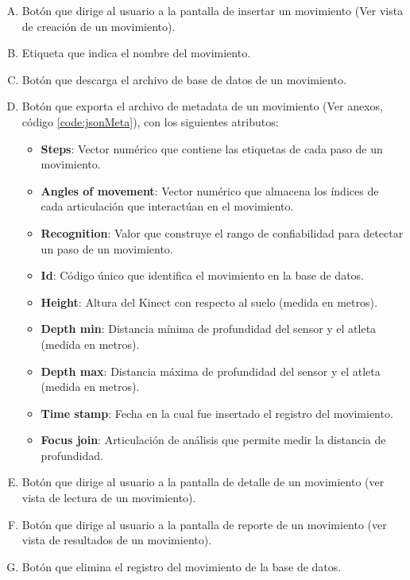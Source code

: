 \begin{enumerate}[A.]
\item Bot\'on que dirige al usuario a la pantalla de insertar un movimiento (Ver vista de creaci\'on de un movimiento).
\item Etiqueta que indica el nombre del movimiento.
\item Bot\'on que descarga el archivo de base de datos de un movimiento.
\item Bot\'on que exporta el archivo de metadata de un movimiento (Ver anexos, c\'odigo \ref{code:jsonMeta}), con los siguientes atributos:
	\begin{itemize}
	\item \textbf{Steps}: Vector num\'erico que contiene las etiquetas de cada paso de un movimiento.
	\item \textbf{Angles of movement}: Vector num\'erico que almacena los \'indices de cada articulaci\'on que interact\'uan en el movimiento.
	\item \textbf{Recognition}: Valor que construye  el rango de confiabilidad para detectar un paso de un movimiento.
	\item \textbf{Id}: C\'odigo \'unico que identifica el movimiento en la base de datos.
	\item \textbf{Height}: Altura del Kinect con respecto al suelo (medida en metros).	
	\item \textbf{Depth min}: Distancia m\'inima de profundidad del sensor y el atleta (medida en metros).
	\item \textbf{Depth max}: Distancia m\'axima de profundidad del sensor y el atleta (medida en metros).
	\item \textbf{Time stamp}: Fecha en la cual fue insertado el registro del movimiento.
	\item \textbf{Focus join}: Articulaci\'on de an\'alisis que permite medir la distancia de profundidad. 
	\end{itemize}
\item Bot\'on que dirige al usuario a la pantalla de detalle de un movimiento (ver vista de lectura de un movimiento).
\item Bot\'on que dirige al usuario a la pantalla de reporte de un movimiento (ver vista de resultados de un movimiento).
\item Bot\'on que elimina el registro del movimiento de la base de datos.
\end{enumerate}
